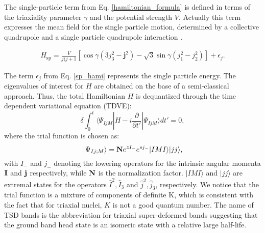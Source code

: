 \documentclass[twocolumn,article,amsmath,amssymb,floatfix,aps]{revtex4}
\begin{document}
The single-particle term from Eq.  \ref{hamiltonian_formula} is defined in terms of the triaxiality parameter $\gamma$ and the potential strength $V$. Actually  this term expresses the mean field for the single particle motion, determined by a collective quadrupole and a single particle quadrupole interaction \cite{Davyd}. 

\begin{align}
    H_\text{sp} = \frac{V}{j(j+1}\left[\cos\gamma\left(3j_3^2-\mathbf{j}^2\right)-\sqrt{3}\sin\gamma\left(j_1^2-j_2^2\right)\right]+\epsilon_j.  \label{sp_hami}
\end{align}

The term $\epsilon_j$ from Eq.  \ref{sp_hami} represents the single particle energy. 
The eigenvalues of interest for $H$ are obtained on the base of a semi-classical approach. 
Thus, the total Hamiltonian $H$ is dequantized through  the time dependent variational equation (TDVE):
\begin{equation}
\delta\int_{0}^{t}\langle \Psi_{IjM}|H-i\frac{\partial}{\partial t'}|\Psi_{IjM}\rangle d t'=0,
\end{equation}
where the trial function is chosen as:
\begin{equation}
|\Psi_{Ij;M}\rangle ={\bf N}e^{z I_-}e^{s j_-}|IMI\rangle |jj\rangle ,
\end{equation} 
with $I_-$ and ${j}_-$ denoting the lowering operators for the intrinsic angular momenta ${\bf I}$ and ${\bf j}$ respectively, while ${\bf N}$ is  the normalization factor. 
$|IMI\rangle $ and $|jj\rangle$ are extremal states for the operators ${\hat I}^2, {\hat I}_3$ and ${\hat j}^2, {\hat j}_3$, respectively.  We notice that the trial function is a mixture of  components of definite K, which is consistent with the fact that for triaxial nuclei, $K$ is not a good quantum number.  The name of TSD bands is the abbreviation for triaxial super-deformed bands suggesting that the ground band head state is an isomeric state with a relative large half-life. 
 
\end{document}
